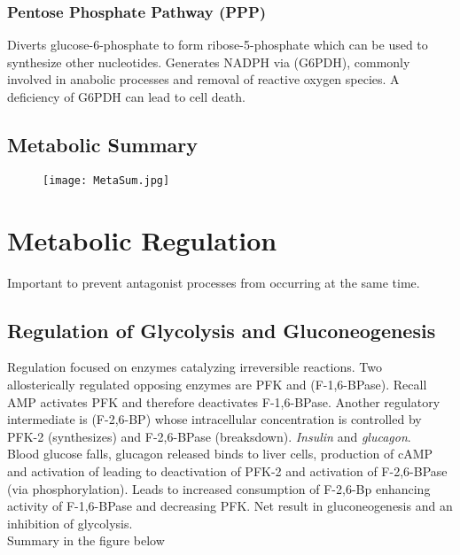 \documentclass[../Bio_chemistryReview.tex]{subfiles}
\begin{document}
\subsubsection{Pentose Phosphate Pathway (PPP)}

Diverts glucose-6-phosphate to form ribose-5-phosphate which can be used to
synthesize other nucleotides. Generates NADPH via  (G6PDH), commonly involved in anabolic processes and removal of
reactive oxygen species. A deficiency of G6PDH can lead to cell death.

\subsection{Metabolic Summary}

\begin{figure}[h]
  \centering
  \texttt{[image: MetaSum.jpg]}
\end{figure}

\section{Metabolic Regulation}

Important to prevent antagonist processes from occurring at the same time.

\subsection{Regulation of Glycolysis and Gluconeogenesis}

Regulation focused on enzymes catalyzing irreversible reactions. Two
allosterically regulated opposing enzymes are PFK and
 (F-1,6-BPase). Recall AMP activates PFK and
therefore deactivates F-1,6-BPase. Another regulatory intermediate is
 (F-2,6-BP) whose intracellular concentration
is controlled by PFK-2 (synthesizes) and F-2,6-BPase (breaksdown).
\emph{Insulin} and \emph{glucagon}.\\
Blood glucose falls, glucagon released
binds to liver cells, production of cAMP and activation of  leading to deactivation of PFK-2 and activation of F-2,6-BPase (via
phosphorylation). Leads to increased consumption of F-2,6-Bp enhancing activity
of F-1,6-BPase and decreasing PFK. Net result in gluconeogenesis and an
inhibition of glycolysis.\\
Summary in the figure below
\end{document}
